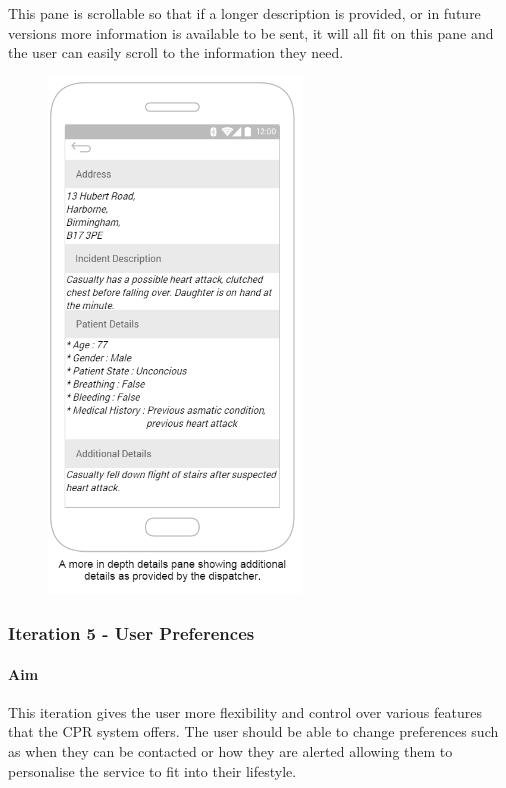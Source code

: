 \documentclass{article}
\begin{document}
This pane is scrollable so that if a longer description is provided, or in future versions more information is available to be sent, it will all fit on this pane and the user can easily scroll to the information they need.\\

	\begin{figure}[H]
		\centering
		\vspace{-20pt}
		\includegraphics[width=0.6\textwidth]{"Iteration4/Additional Details - 2"}
	\end{figure}
	
	
\pagebreak
		\subsubsection{Iteration 5 - User Preferences}
		\paragraph{Aim}
		This iteration gives the user more flexibility and control over various features that the CPR system offers. The user should be able to change preferences such as when they can be contacted or how they are alerted allowing them to personalise the service to fit into their lifestyle.
		
\end{document}
